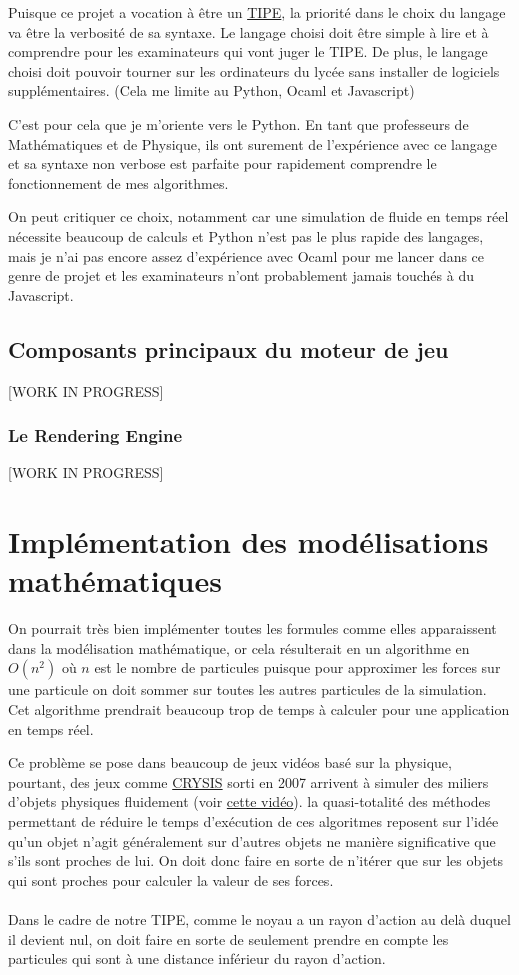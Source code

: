 \documentclass[a4paper,10pt]{report}
\begin{document}
Puisque ce projet a vocation à être un \href{https://www.scei-concours.fr/tipe.php}{TIPE}, la priorité dans le choix du langage va être la verbosité de sa syntaxe. Le langage choisi doit être simple à lire et à comprendre pour les examinateurs qui vont juger le TIPE. De plus, le langage choisi doit pouvoir tourner sur les ordinateurs du lycée sans installer de logiciels supplémentaires. (Cela me limite au Python, Ocaml et Javascript)

C'est pour cela que je m'oriente vers le Python.
En tant que professeurs de Mathématiques et de Physique, ils ont surement de l'expérience avec ce langage et sa syntaxe non verbose est parfaite pour rapidement comprendre le fonctionnement de mes algorithmes.

On peut critiquer ce choix, notamment car une simulation de fluide en temps réel nécessite beaucoup de calculs et Python n'est pas le plus rapide des langages, mais je n'ai pas encore assez d'expérience avec Ocaml pour me lancer dans ce genre de projet et les examinateurs n'ont probablement jamais touchés à du Javascript.

\subsection{Composants principaux du moteur de jeu}
[WORK IN PROGRESS]

\subsubsection{Le Rendering Engine}
[WORK IN PROGRESS]

\section{Implémentation des modélisations mathématiques}

On pourrait très bien implémenter toutes les formules comme elles apparaissent dans la modélisation mathématique, or cela résulterait en un algorithme en $O(n^2)$ où $n$ est le nombre de particules puisque pour approximer les forces sur une particule on doit sommer sur toutes les autres particules de la simulation. Cet algorithme prendrait beaucoup trop de temps à calculer pour une application en temps réel.

Ce problème se pose dans beaucoup de jeux vidéos basé sur la physique, pourtant, des jeux comme \href{https://fr.wikipedia.org/wiki/Crysis}{CRYSIS} sorti en 2007 arrivent à simuler des miliers d'objets physiques fluidement (voir \href{https://www.youtube.com/watch?v=YG5qDeWHNmk}{cette vidéo}). la quasi-totalité des méthodes permettant de réduire le temps d'exécution de ces algoritmes reposent sur l'idée qu'un objet n'agit généralement sur d'autres objets ne manière significative que s'ils sont proches de lui. On doit donc faire en sorte de n'itérer que sur les objets qui sont proches pour calculer la valeur de ses forces.
\\
\\
Dans le cadre de notre TIPE, comme le noyau a un rayon d'action au delà duquel il devient nul, on doit faire en sorte de seulement prendre en compte les particules qui sont à une distance inférieur du rayon d'action.
\end{document}
